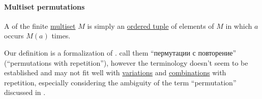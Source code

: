 \paragraph{Multiset permutations}

\begin{definition}\label{def:multiset_permutation}\mimprovised
  A  of the finite \hyperref[def:multiset]{multiset} \( M \) is simply an \hyperref[def:ordered_tuple]{ordered tuple} of elements of \( M \) in which \( a \) occurs \( M(a) \) times.
\end{definition}
\begin{comments}
  \item Our definition is a formalization of .  call them \enquote{пермутации с повторение} (\enquote{permutations with repetition}), however the terminology doesn't seem to be established and may not fit well with \hyperref[def:combinatorial_variation]{variations} and \hyperref[def:combinatorial_combination]{combinations} with repetition, especially considering the ambiguity of the term \enquote{permutation} discussed in .
\end{comments}

